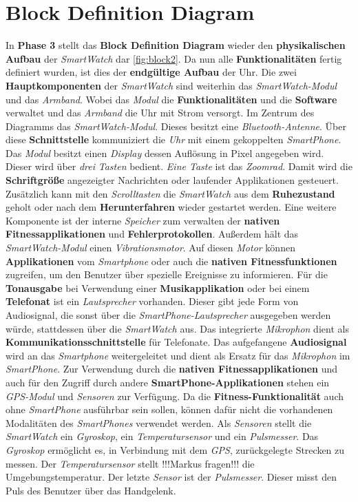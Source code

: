 \section{Block Definition Diagram}
In \textbf{Phase 3} stellt das \textbf{Block Definition Diagram} wieder den \textbf{physikalischen Aufbau} der \textit{SmartWatch} dar \ref{fig:block2}. Da nun alle \textbf{Funktionalitäten} fertig definiert wurden, ist dies der \textbf{endgültige Aufbau} der Uhr. Die zwei \textbf{Hauptkomponenten} der \textit{SmartWatch} sind weiterhin das \textit{SmartWatch-Modul} und das \textit{Armband}. Wobei das \textit{Modul} die \textbf{Funktionalitäten} und die \textbf{Software} verwaltet und das \textit{Armband} die Uhr mit Strom versorgt. Im Zentrum des Diagramms das \textit{SmartWatch-Modul}. Dieses besitzt eine \textit{Bluetooth-Antenne}. Über diese \textbf{Schnittstelle} kommuniziert die \textit{Uhr} mit einem gekoppelten \textit{SmartPhone}. Das \textit{Modul} besitzt einen \textit{Display} dessen Auflösung in Pixel angegeben wird. Dieser wird über \textit{drei} \textit{Tasten} bedient. \textit{Eine Taste} ist das \textit{Zoomrad}. Damit wird die \textbf{Schriftgröße} angezeigter Nachrichten oder laufender Applikationen gesteuert. Zusätzlich kann mit den \textit{Scrolltasten} die \textit{SmartWatch} aus dem \textbf{Ruhezustand} geholt oder nach dem \textbf{Herunterfahren} wieder gestartet werden. Eine weitere Komponente ist der interne \textit{Speicher} zum verwalten der \textbf{nativen Fitnessapplikationen} und \textbf{Fehlerprotokollen}. Außerdem hält das \textit{SmartWatch-Modul} einen \textit{Vibrationsmotor}. Auf diesen \textit{Motor} können \textbf{Applikationen} vom \textit{Smartphone} oder auch die \textbf{nativen Fitnessfunktionen} zugreifen, um den Benutzer über spezielle Ereignisse zu informieren. Für die \textbf{Tonausgabe} bei Verwendung einer \textbf{Musikapplikation} oder bei einem \textbf{Telefonat} ist ein \textit{Lautsprecher} vorhanden. Dieser gibt jede Form von Audiosignal, die sonst über die \textit{SmartPhone-Lautsprecher} ausgegeben werden würde, stattdessen über die \textit{SmartWatch} aus. Das integrierte \textit{Mikrophon} dient als \textbf{Kommunikationsschnittstelle} für Telefonate. Das aufgefangene \textbf{Audiosignal} wird an das \textit{Smartphone} weitergeleitet und dient als Ersatz für das \textit{Mikrophon} im \textit{SmartPhone}. Zur Verwendung durch die \textbf{nativen Fitnessapplikationen} und auch für den Zugriff durch andere \textbf{SmartPhone-Applikationen} stehen ein \textit{GPS-Modul} und \textit{Sensoren} zur Verfügung. Da die \textbf{Fitness-Funktionalität} auch ohne \textit{SmartPhone} ausführbar sein sollen, können dafür nicht die vorhandenen Modalitäten des \textit{SmartPhones} verwendet werden. Als \textit{Sensoren} stellt die \textit{SmartWatch} ein \textit{Gyroskop}, ein \textit{Temperatursensor} und ein \textit{Pulsmesser}. Das \textit{Gyroskop} ermöglicht es, in Verbindung mit dem \textit{GPS}, zurückgelegte Strecken zu messen. Der \textit{Temperatursensor} stellt !!!Markus fragen!!! die Umgebungstemperatur. Der letzte \textit{Sensor} ist der \textit{Pulsmesser}. Dieser misst den Puls des Benutzer über das Handgelenk.\\
